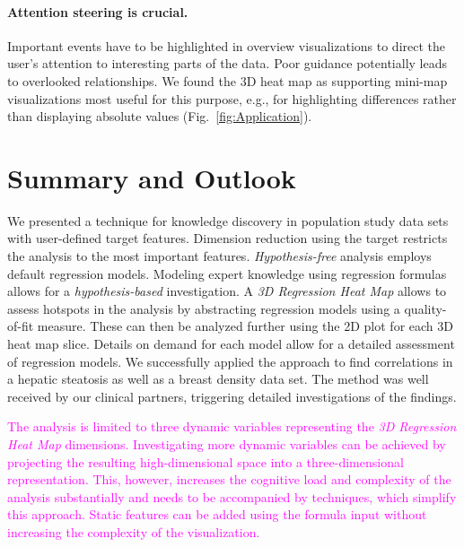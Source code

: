 \documentclass[journal]{style/vgtc} 			          %
\newcommand{\magenta}[1]{\textcolor{magenta}{#1}}
\begin{document}
\paragraph{Attention steering is crucial.}
Important events have to be highlighted in overview visualizations to direct the user's attention to interesting parts of the data.
Poor guidance potentially leads to overlooked relationships.
We found the 3D heat map as supporting mini-map visualizations most useful for this purpose, e.g., for highlighting differences rather than displaying absolute values (Fig.~\ref{fig:Application}).
\section{Summary and Outlook}
We presented a technique for knowledge discovery in population study data sets with user-defined target features.
Dimension reduction using the target restricts the analysis to the most important features.
\emph{Hypothesis-free} analysis employs default regression models.
Modeling expert knowledge using regression formulas allows for a \emph{hypothesis-based} investigation.
A \emph{3D Regression Heat Map} allows to assess hotspots in the analysis by abstracting regression models using a quality-of-fit measure.
These can then be analyzed further using the 2D plot for each 3D heat map slice.
Details on demand for each model allow for a detailed assessment of regression models.
We successfully applied the approach to find correlations in a hepatic steatosis as well as a breast density data set.
The method was well received by our clinical partners, triggering detailed investigations of the findings.

\magenta{
The analysis is limited to three dynamic variables representing the \emph{3D Regression Heat Map} dimensions.
Investigating more dynamic variables can be achieved by projecting the resulting high-dimensional space into a three-dimensional representation.
This, however, increases the cognitive load and complexity of the analysis substantially and needs to be accompanied by techniques, which simplify this approach.
Static features can be added using the formula input without increasing the complexity of the visualization.
}
\end{document}
